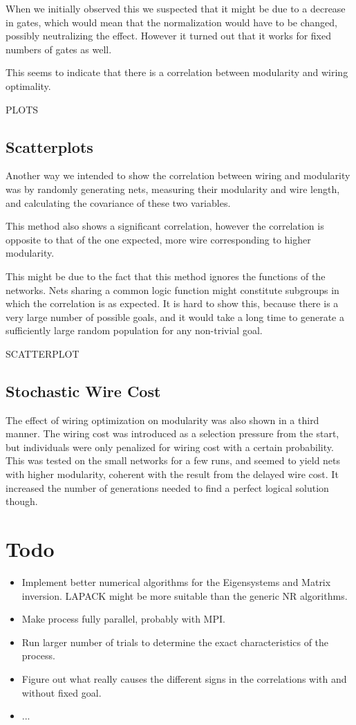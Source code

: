 \documentclass[12pt,a4paper]{article}
\begin{document}
When we initially observed this we suspected that it might be due to a decrease in gates, which would mean that the normalization would have to be changed, possibly neutralizing the effect. However it turned out that it works for fixed numbers of gates as well.

This seems to indicate that there is a correlation between modularity and wiring optimality.

PLOTS
\subsection{Scatterplots}
Another way we intended to show the correlation between wiring and modularity was by randomly generating nets, measuring their modularity and wire length, and calculating the covariance of these two variables.

This method also shows a significant correlation, however the correlation is opposite to that of the one expected, more wire corresponding to higher modularity.

This might be due to the fact that this method ignores the functions of the networks. Nets sharing a common logic function might constitute subgroups in which the correlation is as expected. It is hard to show this, because there is a very large number of possible goals, and it would take a long time to generate a sufficiently large random population for any non-trivial goal.


SCATTERPLOT
\subsection{Stochastic Wire Cost}
The effect of wiring optimization on modularity was also shown in a third manner. The wiring cost was introduced as a selection pressure from the start, but individuals were only penalized for wiring cost with a certain probability. This was tested on the small networks for a few runs, and seemed to yield nets with higher modularity, coherent with the result from the delayed wire cost. It increased the number of generations needed to find a perfect logical solution though.


\section{Todo}
\begin{itemize}
\item Implement better numerical algorithms for the Eigensystems and Matrix inversion. \textsc{LAPACK} might be more suitable than the generic NR algorithms.
\item Make process fully parallel, probably with MPI.
\item Run larger number of trials to determine the exact characteristics of the process.
\item Figure out what really causes the different signs in the correlations with and without fixed goal.
\item ...
\end{itemize}
\end{document}
